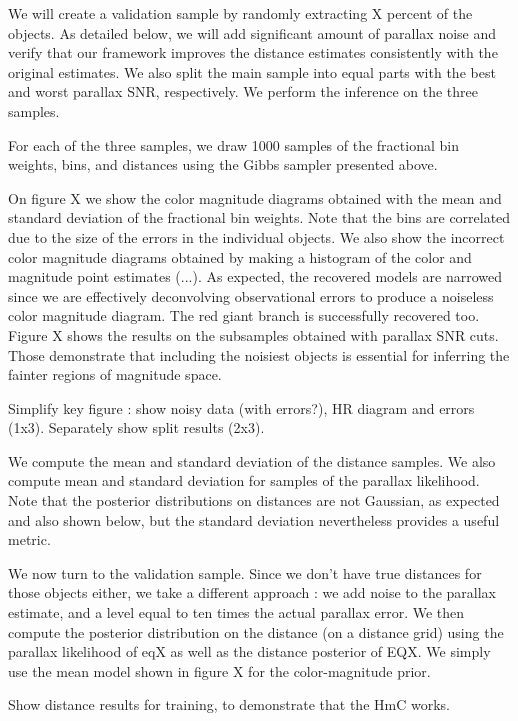 \documentclass[aps,prd,showpacs,superscriptaddress,groupedaddress]{revtex4}  %
\begin{document}
We will create a validation sample by randomly extracting X percent of the objects. As detailed below, we will add significant amount of parallax noise and verify that our framework improves the distance estimates consistently with the original estimates. 
We also split the main sample into equal parts with the best and worst parallax SNR, respectively. We perform the inference on the three samples. 

For each of the three samples, we draw 1000 samples of the fractional bin weights, bins, and distances using the Gibbs sampler presented above. 

On figure X we show the color magnitude diagrams obtained with the mean and standard deviation of the fractional bin weights. 
Note that the bins are correlated due to the size of the errors in the individual objects. 
We also show the incorrect color magnitude diagrams obtained by making a histogram of the color and magnitude point estimates (...). 
As expected, the recovered models are narrowed since we are effectively deconvolving observational errors to produce a noiseless color magnitude diagram. 
The red giant branch is successfully recovered too. 
Figure X shows the results on the subsamples obtained with parallax SNR cuts. Those demonstrate that including the noisiest objects is essential for inferring the fainter regions of magnitude space. 

Simplify key figure : show noisy data (with errors?), HR diagram and errors (1x3). Separately show split results (2x3).

We compute the mean and standard deviation of the distance samples. We also compute mean and standard deviation for samples of the parallax likelihood. Note that the posterior distributions on distances are not Gaussian, as expected and also shown below, but the standard deviation nevertheless provides a useful metric. 

We now turn to the validation sample. Since we don't have true distances for those objects either, we take a different approach : we add noise to the parallax estimate, and a level equal to ten times the actual parallax error. We then compute the posterior distribution on the distance (on a distance grid) using the parallax likelihood of eqX as well as the distance posterior of EQX. We simply use the mean model shown in figure X for the color-magnitude prior. 

Show distance results for training, to demonstrate that the HmC works. 
\end{document}

